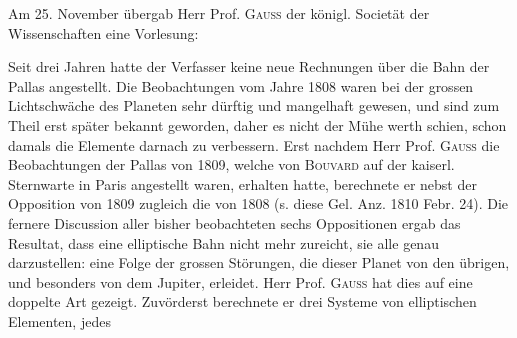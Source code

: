 \par\clearpage
\begingroup
\pagestyle{empty}
\newcommand{\GaussVIAngle}[6]{%
  \makebox[17pt][r]{$#1$}\makebox[4pt][l]{${}#2$}\hspace{2pt}%
  \makebox[12pt][r]{$#3$}\makebox[4pt][l]{${}#4$}\hspace{2pt}%
  \makebox[12pt][r]{$#5$}\makebox[18pt][l]{${}#6$}%
}
\thispagestyle{empty}
\noindent{}%
\par
\vspace*{.30\textheight}
\noindent{}\par\nobreak\medskip
\indent Am 25. November übergab Herr Prof. \textsc{Gauss} der königl. Societät der Wissenschaften
eine Vorlesung:\par\nobreak\smallskip
\noindent{}\par\nobreak\smallskip
\indent Seit drei Jahren hatte der Verfasser keine neue Rechnungen über die Bahn
der Pallas angestellt. Die Beobachtungen vom Jahre 1808 waren bei der grossen
Lichtschwäche des Planeten sehr dürftig und mangelhaft gewesen, und sind zum
Theil erst später bekannt geworden, daher es nicht der Mühe werth schien, schon
damals die Elemente darnach zu verbessern. Erst nachdem Herr Prof. \textsc{Gauss} die
Beobachtungen der Pallas von 1809, welche von \textsc{Bouvard} auf der kaiserl. Sternwarte
in Paris angestellt waren, erhalten hatte, berechnete er nebst der Opposition
von 1809 zugleich die von 1808 (s. diese Gel. Anz. 1810 Febr. 24). Die fernere
Discussion aller bisher beobachteten sechs Oppositionen ergab das Resultat,
dass eine elliptische Bahn nicht mehr zureicht, sie alle genau darzustellen: eine
Folge der grossen Störungen, die dieser Planet von den übrigen, und besonders
von dem Jupiter, erleidet. Herr Prof. \textsc{Gauss} hat dies auf eine doppelte Art gezeigt.
Zuvörderst berechnete er drei Systeme von elliptischen Elementen, jedes
